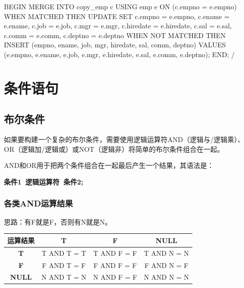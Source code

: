 \documentclass[11pt, a4paper, oneside, UTF8]{ctexbook}
\let\kaishu\relax %
\begin{document}
\begin{plsql}[caption=MERGE示例代码2]
BEGIN
  MERGE INTO copy_emp c
  USING emp e
  ON (c.empno = e.empno)
  WHEN MATCHED THEN
    UPDATE SET
      c.empno = e.empno,
      c.ename = e.ename,
      c.job = e.job,
      c.mgr = e.mgr,
      c.hiredate = e.hiredate,
      c.sal = e.sal,
      c.comm = e.comm,
      c.deptno = e.deptno
  WHEN NOT MATCHED THEN
    INSERT (empno, ename, job, mgr, hiredate, sal, comm, deptno) 
    VALUES (e.empno, e.ename, e.job, e.mgr, e.hiredate, e.sal, e.comm, e.deptno);
END;
/
\end{plsql}

\chapter{条件语句}
\section{布尔条件}
如果要构建一个复杂的布尔条件，需要使用逻辑运算符AND（逻辑与/逻辑乘）、OR（逻辑加/逻辑或）或NOT（逻辑非）将简单的布尔条件组合在一起。

AND和OR用于把两个条件组合在一起最后产生一个结果，其语法是：

{\bfseries\kaishu 条件1\ 逻辑运算符\ 条件2;}

\subsection{各类AND运算结果}
思路：有F就是F，否则有N就是N。
\begin{center}
  \begin{minipage}{\textwidth}
    \centering
    \begin{tabular}{|c|c|c|c|} 
      \hline %
      \textbf{运算结果}   &   \textbf{T}  &   \textbf{F}  &   \textbf{NULL} \\
      \hline
      \textbf{T}          &   T AND T = T & T AND F = F  &  T AND N = N \\
      \hline
      \textbf{F}          &   F AND T = F & F AND F = F  &  F AND N = F \\
      \hline
      \textbf{NULL}       &   N AND T = N & N AND F = F  &  N AND N = N \\
      \hline
    \end{tabular}
    \captionsetup{hypcap=false}
    \label{tab:各类AND运算结果表} %
  \end{minipage}
\end{center}
\end{document}
